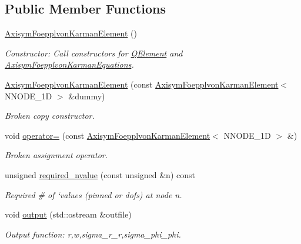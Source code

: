 \subsection*{Public Member Functions}
\begin{DoxyCompactItemize}
\item 
\hyperlink{classoomph_1_1AxisymFoepplvonKarmanElement_ae05df596899638a8ee2800266412d163}{Axisym\+Foepplvon\+Karman\+Element} ()
\begin{DoxyCompactList}\small\item\em Constructor\+: Call constructors for \hyperlink{classoomph_1_1QElement}{Q\+Element} and \hyperlink{classoomph_1_1AxisymFoepplvonKarmanEquations}{Axisym\+Foepplvon\+Karman\+Equations}. \end{DoxyCompactList}\item 
\hyperlink{classoomph_1_1AxisymFoepplvonKarmanElement_a3258341718feafc5196b85594911fd19}{Axisym\+Foepplvon\+Karman\+Element} (const \hyperlink{classoomph_1_1AxisymFoepplvonKarmanElement}{Axisym\+Foepplvon\+Karman\+Element}$<$ N\+N\+O\+D\+E\+\_\+1D $>$ \&dummy)
\begin{DoxyCompactList}\small\item\em Broken copy constructor. \end{DoxyCompactList}\item 
void \hyperlink{classoomph_1_1AxisymFoepplvonKarmanElement_a2fc69c8a64430a00d344eb55562ab8f2}{operator=} (const \hyperlink{classoomph_1_1AxisymFoepplvonKarmanElement}{Axisym\+Foepplvon\+Karman\+Element}$<$ N\+N\+O\+D\+E\+\_\+1D $>$ \&)
\begin{DoxyCompactList}\small\item\em Broken assignment operator. \end{DoxyCompactList}\item 
unsigned \hyperlink{classoomph_1_1AxisymFoepplvonKarmanElement_ab481ef11edd5211f38bb6e9936d2351f}{required\+\_\+nvalue} (const unsigned \&n) const
\begin{DoxyCompactList}\small\item\em Required \# of `values\textquotesingle{} (pinned or dofs) at node n. \end{DoxyCompactList}\item 
void \hyperlink{classoomph_1_1AxisymFoepplvonKarmanElement_a76cf09e19fc810a96251a64572248f76}{output} (std\+::ostream \&outfile)
\begin{DoxyCompactList}\small\item\em Output function\+: r,w,sigma\+\_\+r\+\_\+r,sigma\+\_\+phi\+\_\+phi. \end{DoxyCompactList}\item 

\end{DoxyCompactItemize}
